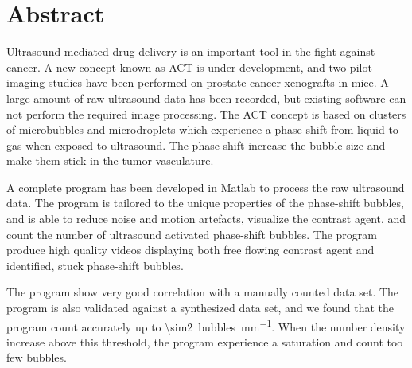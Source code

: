 \section{Abstract}
Ultrasound mediated drug delivery is an important tool in the fight against cancer. A new concept known  as ACT\texttrademark{} is under development, and two pilot imaging studies have been performed on prostate cancer xenografts in mice.  A large amount of raw ultrasound data has been recorded, but existing software can not perform the required image processing. The ACT\texttrademark{} concept is based on clusters of microbubbles and microdroplets which experience a phase-shift from liquid to gas when exposed to ultrasound. The phase-shift increase the bubble size and make them stick in the tumor vasculature. 

A complete program has been developed in Matlab to process the raw ultrasound data. The program is tailored to the unique properties of the phase-shift bubbles, and is able to reduce noise and motion artefacts, visualize the contrast agent, and count the number of ultrasound activated phase-shift bubbles. The program produce high quality videos displaying both free flowing contrast agent and identified, stuck phase-shift bubbles. 

The program show very good correlation with a manually counted data set. The program is also validated against a synthesized data set, and we found that the program count accurately up to \SI{\sim2}{bubbles\per\milli\meter}. When the number density increase above this threshold, the program experience a saturation and count too few bubbles.  

